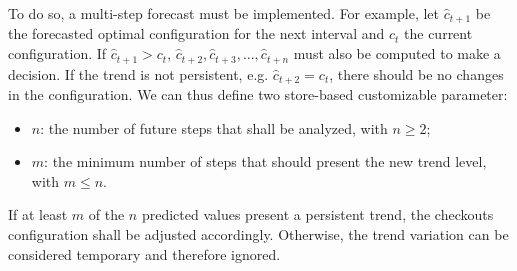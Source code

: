 To do so, a multi-step forecast must be implemented. For example, let \( \hat{c}_{t+1} \) be the forecasted optimal configuration for the next interval and \( c_t \) the current configuration. If \( \hat{c}_{t+1} > c_t \), \( \hat{c}_{t+2}, \hat{c}_{t+3}, ..., \hat{c}_{t+n} \) must also be computed to make a decision. If the trend is not persistent, e.g. \( \hat{c}_{t+2} = c_t \), there should be no changes in the configuration. We can thus define two store-based customizable parameter:
\begin{itemize}
  \item \( n \): the number of future steps that shall be analyzed, with \( n \ge 2 \);
  \item \( m \): the minimum number of steps that should present the new trend level, with \( m \le n \).
\end{itemize}

If at least \( m \) of the \( n \) predicted values present a persistent trend, the checkouts configuration shall be adjusted accordingly. Otherwise, the trend variation can be considered temporary and therefore ignored.

\clearpage